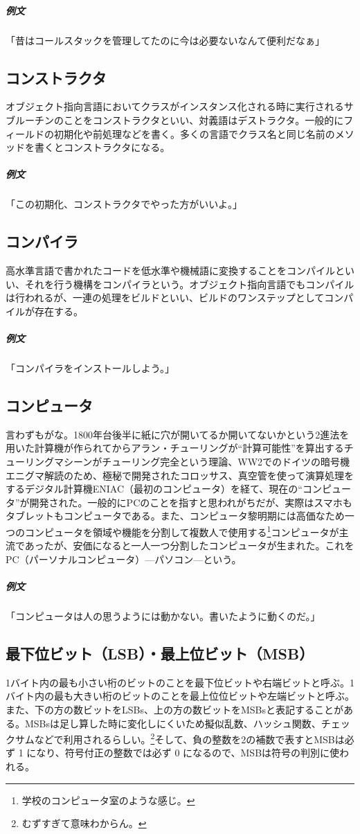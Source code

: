 \documentclass[a4paper]{ltjsreport}
\begin{document}
\subparagraph{例文} 「昔はコールスタックを管理してたのに今は必要ないなんて便利だなぁ」

\subsection{コンストラクタ}
オブジェクト指向言語においてクラスがインスタンス化される時に実行されるサブルーチンのことをコンストラクタといい、対義語はデストラクタ。一般的にフィールドの初期化や前処理などを書く。多くの言語でクラス名と同じ名前のメソッドを書くとコンストラクタになる。

\subparagraph{例文} 「この初期化、コンストラクタでやった方がいいよ。」

\subsection{コンパイラ}
高水準言語で書かれたコードを低水準や機械語に変換することをコンパイルといい、それを行う機構をコンパイラという。オブジェクト指向言語でもコンパイルは行われるが、一連の処理をビルドといい、ビルドのワンステップとしてコンパイルが存在する。

\subparagraph{例文} 「コンパイラをインストールしよう。」

\subsection{コンピュータ}
言わずもがな。1800年台後半に紙に穴が開いてるか開いてないかという2進法を用いた計算機が作られてからアラン・チューリングが``計算可能性''を算出するチューリングマシーンがチューリング完全という理論、WW2でのドイツの暗号機エニグマ解読のため、極秘で開発されたコロッサス、真空管を使って演算処理をするデジタル計算機ENIAC（最初のコンピュータ）を経て、現在の``コンピュータ''が開発された。一般的にPCのことを指すと思われがちだが、実際はスマホもタブレットもコンピュータである。また、コンピュータ黎明期には高価なため一つのコンピュータを領域や機能を分割して複数人で使用する\footnote{学校のコンピュータ室のような感じ。}コンピュータが主流であったが、安価になると一人一つ分割したコンピュータが生まれた。これをPC（パーソナルコンピュータ）---パソコン---という。

\subparagraph{例文} 「コンピュータは人の思うようには動かない。書いたように動くのだ。」

\subsection{最下位ビット（LSB）・最上位ビット（MSB）}
1バイト内の最も小さい桁のビットのことを最下位ビットや右端ビットと呼ぶ。1バイト内の最も大きい桁のビットのことを最上位位ビットや左端ビットと呼ぶ。また、下の方の数ビットをLSBs、上の方の数ビットをMSBsと表記することがある。MSBsは足し算した時に変化しにくいため擬似乱数、ハッシュ関数、チェックサムなどで利用されるらしい。\footnote{むずすぎて意味わからん。}そして、負の整数を2の補数で表すとMSBは必ず 1 になり、符号付正の整数では必ず 0 になるので、MSBは符号の判別に使われる。
\end{document}
